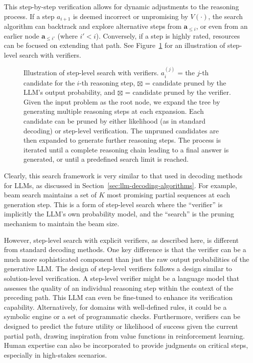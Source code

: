 This step-by-step verification allows for dynamic adjustments to the reasoning process. If a step $a_{i+1}$ is deemed incorrect or unpromising by $V(\cdot)$, the search algorithm can backtrack and explore alternative steps from $\mathbf{a}_{\le i}$, or even from an earlier node $\mathbf{a}_{\le i'}$ (where $i' < i$). Conversely, if a step is highly rated, resources can be focused on extending that path. See Figure~\ref{fig:step-level-search-with-verifiers} for an illustration of step-level search with verifiers.

\begin{figure}[!t]
\centering

\vspace{-0.5cm} \caption{Illustration of step-level search with verifiers. $a_{i}^{(j)}$ = the $j$-th candidate for the $i$-th reasoning step, {\color{blue} $\boxtimes$} = candidate pruned by the LLM's output probability, and {\color{ugreen} $\boxtimes$} = candidate pruned by the verifier. Given the input problem as the root node, we expand the tree by generating multiple reasoning steps at each expansion. Each candidate can be pruned by either likelihood (as in standard decoding) or step-level verification. The unpruned candidates are then expanded to generate further reasoning steps. The process is iterated until a complete reasoning chain leading to a final answer is generated, or until a predefined search limit is reached.}
\label{fig:step-level-search-with-verifiers}
\end{figure}

Clearly, this search framework is very similar to that used in decoding methods for LLMs, as discussed in Section~\ref{sec:llm-decoding-algorithms}. For example, beam search maintains a set of $K$ most promising partial sequences at each generation step. This is a form of step-level search where the ``verifier'' is implicitly the LLM's own probability model, and the ``search'' is the pruning mechanism to maintain the beam size.

However, step-level search with explicit verifiers, as described here, is different from standard decoding methods. One key difference is that the verifier can be a much more sophisticated component than just the raw output probabilities of the generative LLM. The design of step-level verifiers follows a design similar to solution-level verification. A step-level verifier might be a language model that assesses the quality of an individual reasoning step within the context of the preceding path. This LLM can even be fine-tuned to enhance its verification capability. Alternatively, for domains with well-defined rules, it could be a symbolic engine or a set of programmatic checks. Furthermore, verifiers can be designed to predict the future utility or likelihood of success given the current partial path, drawing inspiration from value functions in reinforcement learning. Human expertise can also be incorporated to provide judgments on critical steps, especially in high-stakes scenarios.

